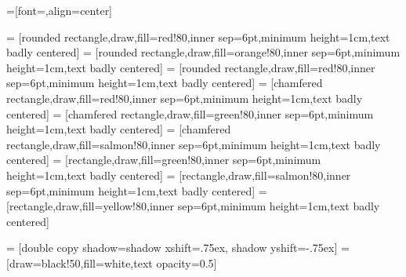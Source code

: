 

=[font=\sffamily,align=center]

\newcommand{\fillOpacity}{80}

\newcommand{\compShape}{rectangle}
\newcommand{\groupShape}{chamfered rectangle}
\newcommand{\procShape}{rounded rectangle}

\newcommand{\explicitColor}{green}
\newcommand{\implicitColor}{salmon}
\newcommand{\optimizationColor}{red} %

 = [\procShape,draw,fill=\optimizationColor!\fillOpacity,inner sep=6pt,minimum height=1cm,text badly centered]
 = [\procShape,draw,fill=orange!\fillOpacity,inner sep=6pt,minimum height=1cm,text badly centered]
 = [\procShape,draw,fill=\optimizationColor!\fillOpacity,inner sep=6pt,minimum height=1cm,text badly centered]
 = [\groupShape,draw,fill=\optimizationColor!\fillOpacity,inner sep=6pt,minimum height=1cm,text badly centered]
 = [\groupShape,draw,fill=\explicitColor!\fillOpacity,inner sep=6pt,minimum height=1cm,text badly centered]
 = [\groupShape,draw,fill=\implicitColor!\fillOpacity,inner sep=6pt,minimum height=1cm,text badly centered]
 = [\compShape,draw,fill=\explicitColor!\fillOpacity,inner sep=6pt,minimum height=1cm,text badly centered]
 = [\compShape,draw,fill=\implicitColor!\fillOpacity,inner sep=6pt,minimum height=1cm,text badly centered]
 = [\compShape,draw,fill=yellow!\fillOpacity,inner sep=6pt,minimum height=1cm,text badly centered]

 = [double copy shadow={shadow xshift=.75ex, shadow yshift=-.75ex}]
 = [draw=black!50,fill=white,text opacity=0.5]

